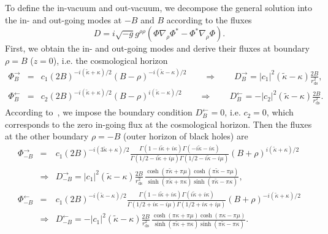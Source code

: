 \documentclass[aps,nofootinbib,superscriptaddress
]{revtex4}
\begin{document}
To define the in-vacuum and out-vacuum, we decompose the general solution into the in- and out-going modes at $-B$ and $B$ according to the fluxes
\begin{equation}
D = i \sqrt{-g} g^{\rho\rho} (\Phi \nabla_\rho \Phi^* - \Phi^* \nabla_\rho \Phi).
\end{equation}
First, we obtain the in- and out-going modes and derive their fluxes at boundary $\rho = B$ ($z = 0$), i.e. the cosmological horizon
\begin{eqnarray}
\Phi_B^\rightarrow &=& c_1 (2 B)^{-i (\tilde{\kappa} + \kappa)/2} (B - \rho)^{-i (\tilde{\kappa} - \kappa)/2} \qquad \Rightarrow \qquad D_B^\rightarrow = |c_1|^2 (\tilde{\kappa} - \kappa) \frac{2 B}{r_\mathrm{ds}^2},
\\
\Phi_B^\leftarrow &=& c_2 (2 B)^{-i (\tilde{\kappa} + \kappa)/2} (B - \rho)^{i (\tilde{\kappa} - \kappa)/2} \qquad \Rightarrow \qquad D_B^\leftarrow = - |c_2|^2 (\tilde{\kappa} - \kappa) \frac{2 B}{r_\mathrm{ds}^2}.
\end{eqnarray}
According to~\cite{Chen:2012zn}, we impose the boundary condition $D_B^\leftarrow = 0$, i.e. $c_2 = 0$, which corresponds to the zero in-going flux at the cosmological horizon. Then the fluxes at the other boundary $\rho = - B$ (outer horizon of black holes) are
\begin{eqnarray}
\Phi_{-B}^\rightarrow &=& c_1 (2 B)^{-i (3 \tilde{\kappa} + \kappa)/2} \frac{\Gamma(1 - i \tilde{\kappa} + i \kappa) \Gamma(-i \tilde{\kappa} - i \kappa)}{\Gamma(1/2 - i \tilde{\kappa} + i \mu) \Gamma(1/2 - i \tilde{\kappa} - i \mu)} (B + \rho)^{i (\tilde{\kappa} + \kappa)/2}
\\
&\Rightarrow& D_{-B}^\rightarrow = |c_1|^2 (\tilde{\kappa} - \kappa) \frac{2 B}{r_\mathrm{ds}^2} \, \frac{\cosh(\pi \tilde{\kappa} + \pi \mu) \cosh(\pi \tilde{\kappa} - \pi \mu)}{\sinh(\pi \tilde{\kappa} + \pi \kappa) \sinh(\pi \tilde{\kappa} - \pi \kappa)},
\\
\Phi_{-B}^\leftarrow &=& c_1 (2 B)^{-i (\tilde{\kappa} - \kappa)/2} \frac{\Gamma(1 - i \tilde{\kappa} + i \kappa) \Gamma(i \tilde{\kappa} + i \kappa)}{\Gamma(1/2 + i \kappa - i \mu) \Gamma(1/2 + i \kappa + i \mu)} (B + \rho)^{-i (\tilde{\kappa} + \kappa)/2}
\\
&\Rightarrow& D_{-B}^\leftarrow = - |c_1|^2 (\tilde{\kappa} - \kappa) \frac{2 B}{r_\mathrm{ds}^2} \, \frac{\cosh(\pi \kappa + \pi \mu) \cosh(\pi \kappa - \pi \mu)}{\sinh(\pi \tilde{\kappa} + \pi \kappa) \sinh(\pi \tilde{\kappa} - \pi \kappa)}.
\end{eqnarray}
\end{document}
